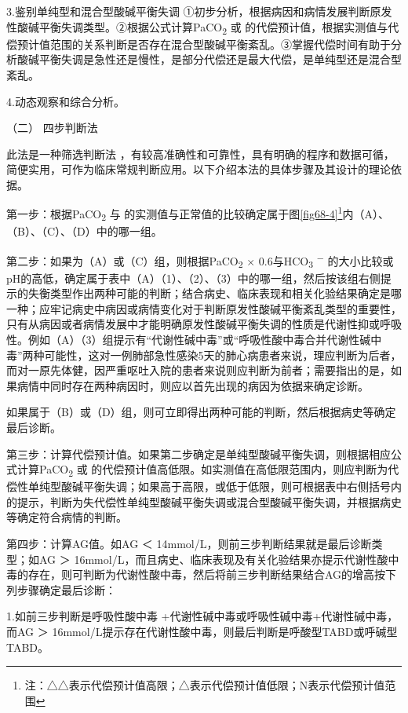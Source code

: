 3.鉴别单纯型和混合型酸碱平衡失调
①初步分析，根据病因和病情发展判断原发性酸碱平衡失调类型。②根据公式计算PaCO\textsubscript{2}
或{}
的代偿预计值，根据实测值与代偿预计值范围的关系判断是否存在混合型酸碱平衡紊乱。③掌握代偿时间有助于分析酸碱平衡失调是急性还是慢性，是部分代偿还是最大代偿，是单纯型还是混合型紊乱。

4.动态观察和综合分析。

\hypertarget{text00209.htmlux5cux23CHP6-5-8-2-2}{}
（二） 四步判断法

此法是一种筛选判断法
，有较高准确性和可靠性，具有明确的程序和数据可循，简便实用，可作为临床常规判断应用。以下介绍本法的具体步骤及其设计的理论依据。

第一步：根据PaCO\textsubscript{2} 与{}
的实测值与正常值的比较确定属于图\ref{fig68-4}\footnote{注：△△表示代偿预计值高限；△表示代偿预计值低限；N表示代偿预计值范围}内（A）、（B）、（C）、（D）中的哪一组。

第二步：如果为（A）或（C）组，则根据PaCO\textsubscript{2} ×
0.6与HCO\textsubscript{3} \textsuperscript{−}
的大小比较或pH的高低，确定属于表中（A）（1）、（2）、（3）中的哪一组，然后按该组右侧提示的失衡类型作出两种可能的判断；结合病史、临床表现和相关化验结果确定是哪一种；应牢记病史中病因或病情变化对于判断原发性酸碱平衡紊乱类型的重要性，只有从病因或者病情发展中才能明确原发性酸碱平衡失调的性质是代谢性抑或呼吸性。例如（A）（3）组提示有“代谢性碱中毒”或“呼吸性酸中毒合并代谢性碱中毒”两种可能性，这对一例肺部急性感染5天的肺心病患者来说，理应判断为后者，而对一原先体健，因严重呕吐入院的患者来说则应判断为前者；需要指出的是，如果病情中同时存在两种病因时，则应以首先出现的病因为依据来确定诊断。

如果属于（B）或（D）组，则可立即得出两种可能的判断，然后根据病史等确定最后诊断。

第三步：计算代偿预计值。如果第二步确定是单纯型酸碱平衡失调，则根据相应公式计算PaCO\textsubscript{2}
或{}
的代偿预计值高低限。如实测值在高低限范围内，则应判断为代偿性单纯型酸碱平衡失调；如果高于高限，或低于低限，则可根据表中右侧括号内的提示，判断为失代偿性单纯型酸碱平衡失调或混合型酸碱平衡失调，并根据病史等确定符合病情的判断。

第四步：计算AG值。如AG ＜
14mmol/L，则前三步判断结果就是最后诊断类型；如AG ＞
16mmol/L，而且病史、临床表现及有关化验结果亦提示代谢性酸中毒的存在，则可判断为代谢性酸中毒，然后将前三步判断结果结合AG的增高按下列步骤确定最后诊断：

1.如前三步判断是呼吸性酸中毒
+代谢性碱中毒或呼吸性碱中毒+代谢性碱中毒，而AG ＞
16mmol/L提示存在代谢性酸中毒，则最后判断是呼酸型TABD或呼碱型TABD。

